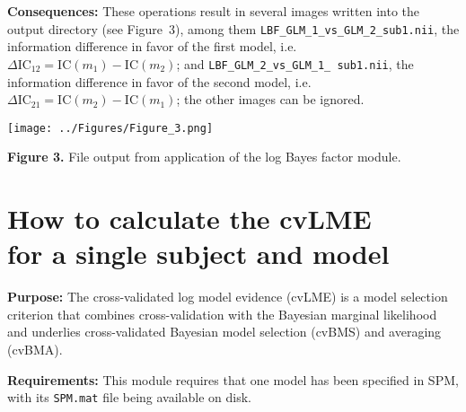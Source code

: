 \documentclass[a4paper,12pt]{article}
\begin{document}
\textbf{Consequences:} These operations result in several images written into the output directory (see Figure~3), among them \texttt{LBF\_GLM\_1\_vs\_GLM\_2\_sub1.nii}, the information difference in favor of the first model, i.e. $\Delta\mathrm{IC}_{12} = \mathrm{IC}(m_1) - \mathrm{IC}(m_2)$; and \texttt{LBF\_GLM\_2\_vs\_GLM\_1\_ sub1.nii}, the information difference in favor of the second model, i.e. $\Delta\mathrm{IC}_{21} = \mathrm{IC}(m_2) - \mathrm{IC}(m_1)$; the other images can be ignored.

\vspace{1em}
\begin{flushleft}
\texttt{[image: ../Figures/Figure\_3.png]}
\end{flushleft}
\vspace{-1em}

\textbf{Figure 3.} File output from application of the log Bayes factor module.


\pagebreak
\section[How to calculate the cvLME for a single subject and model]{How to calculate the cvLME \\ for a single subject and model} \label{sec:cvLME-man}

\textbf{Purpose:} The cross-validated log model evidence (cvLME) is a model selection criterion that combines cross-validation with the Bayesian marginal likelihood and underlies cross-validated Bayesian model selection (cvBMS) and averaging (cvBMA).

\textbf{Requirements:} This module requires that one model has been specified in SPM, with its \texttt{SPM.mat} file being available on disk.
\end{document}
